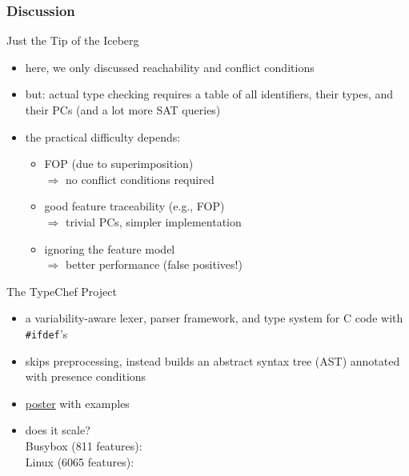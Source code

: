 \subsubsection{Discussion}

\begin{frame}{\myframetitle}
	\begin{mycolumns}
		\begin{note}{Just the Tip of the Iceberg}
			\begin{itemize}
				\item here, we only discussed reachability and conflict conditions
				\item but: actual type checking requires a table of all identifiers, their types, and their PCs (and a lot more SAT queries)
				\item the practical difficulty depends:
				\begin{itemize}
					\item FOP (due to superimposition)\\
						$\Rightarrow$ no conflict conditions required
					\item good feature traceability (e.g., FOP)\\
						$\Rightarrow$ trivial PCs, simpler implementation
					\item ignoring the feature model\\
						$\Rightarrow$ better performance (false positives!)
				\end{itemize}
			\end{itemize}
		\end{note}
	\mynextcolumn
		\begin{example}{The TypeChef Project \mysource{\typechef}}
			\begin{itemize}
				\item a variability-aware lexer, parser framework, and type system for C code with \texttt{\#ifdef}'s
				\item skips preprocessing, instead builds an abstract syntax tree (AST) annotated with presence conditions
				\item \href{https://ckaestne.github.io/TypeChef/typechef-poster.png}{poster} with examples
				\item does it scale?\\[1ex]
				{\small Busybox (811 features): } \\[1ex]
				{\small Linux (6065 features): }  %
			\end{itemize}
		\end{example}
	\end{mycolumns}
\end{frame}

